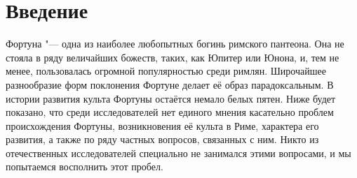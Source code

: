 \setlength{\epigraphrule}{0pt}
\chapter*{Введение}







Фортуна "--- одна из наиболее любопытных богинь римского пантеона. Она не стояла в ряду величайших божеств, таких, как Юпитер или Юнона, и, тем не менее, пользовалась огромной популярностью среди римлян. Широчайшее разнообразие форм поклонения Фортуне делает её образ парадоксальным. В истории развития культа Фортуны остаётся немало белых пятен. Ниже будет показано, что среди исследователей нет единого мнения касательно проблем происхождения Фортуны, возникновения её культа в Риме, характера его развития, а также по ряду частных вопросов, связанных с ним. Никто из отечественных исследователей специально не занимался этими вопросами, и мы попытаемся восполнить этот пробел.

